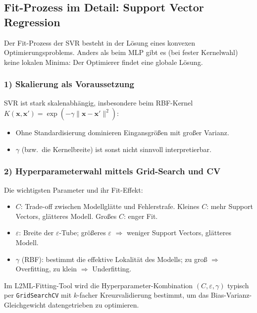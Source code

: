 \documentclass[11pt,a4paper]{report}
\begin{document}
\subsection{Fit-Prozess im Detail: Support Vector Regression}
\label{sec:svr_fit_process}

Der Fit-Prozess der SVR besteht in der L\"{o}sung eines konvexen Optimierungsproblems.
Anders als beim MLP gibt es (bei fester Kernelwahl) keine lokalen Minima: Der Optimierer
findet eine globale L\"{o}sung.

\subsubsection{1) Skalierung als Voraussetzung}
SVR ist stark skalenabh\"{a}ngig, insbesondere beim RBF-Kernel
$K(\mathbf{x},\mathbf{x}') = \exp(-\gamma \lVert \mathbf{x}-\mathbf{x}'\rVert^2)$:
\begin{itemize}
\item Ohne Standardisierung dominieren Eingansgr\"{o}\ss{}en mit gro\ss{}er Varianz.
\item $\gamma$ (bzw.\ die Kernelbreite) ist sonst nicht sinnvoll interpretierbar.
\end{itemize}

\subsubsection{2) Hyperparameterwahl mittels Grid-Search und CV}
Die wichtigsten Parameter und ihr Fit-Effekt:
\begin{itemize}
\item \textbf{$C$}: Trade-off zwischen Modellgl\"{a}tte und Fehlerstrafe. Kleines $C$:
      mehr Support Vectors, gl\"{a}tteres Modell. Gro\ss{}es $C$: enger Fit.
\item \textbf{$\varepsilon$}: Breite der $\varepsilon$-Tube; gr\"{o}\ss{}eres $\varepsilon$
      $\Rightarrow$ weniger Support Vectors, gl\"{a}tteres Modell.
\item \textbf{$\gamma$} (RBF): bestimmt die effektive Lokalit\"{a}t des Modells;
      zu gro\ss{} $\Rightarrow$ Overfitting, zu klein $\Rightarrow$ Underfitting.
\end{itemize}
Im L2ML-Fitting-Tool wird die Hyperparameter-Kombination $(C, \varepsilon, \gamma)$ typisch
per \texttt{GridSearchCV} mit $k$-facher Kreuzvalidierung bestimmt, um das
Bias-Varianz-Gleichgewicht datengetrieben zu optimieren.
\end{document}
